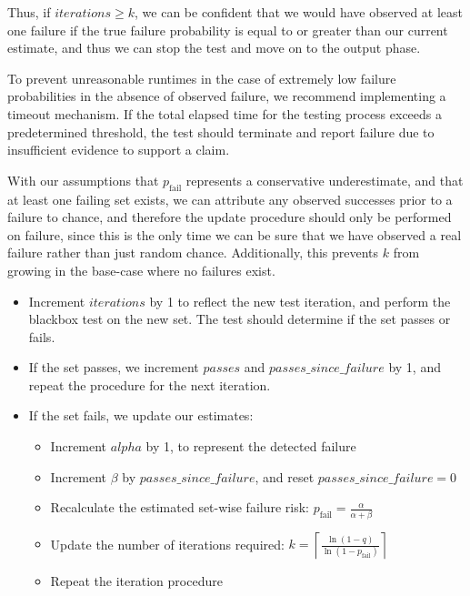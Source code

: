 Thus, if $iterations \ge k$, we can be confident that we would have observed at least one failure if the true failure probability is equal to or greater than our current estimate, and thus we can stop the test and move on to the output phase.

To prevent unreasonable runtimes in the case of extremely low failure probabilities in the absence of observed failure, we recommend implementing a timeout mechanism. If the total elapsed time for the testing process exceeds a predetermined threshold, the test should terminate and report failure due to insufficient evidence to support a claim.


 With our assumptions that $p_{\text{fail}}$ represents a conservative underestimate, and that at least one failing set exists, we can attribute any observed successes prior to a failure to chance, and therefore the update procedure should only be performed on failure, since this is the only time we can be sure that we have observed a real failure rather than just random chance. Additionally, this prevents $k$ from growing in the base-case where no failures exist.

\begin{itemize}
    \item Increment $iterations$ by 1 to reflect the new test iteration, and perform the blackbox test on the new set. The test should determine if the set passes or fails.
    \item If the set passes, we increment $passes$ and $passes\_since\_failure$ by 1, and repeat the procedure for the next iteration.
    \item If the set fails, we update our estimates:
    \begin{itemize}
        \item Increment $alpha$ by 1, to represent the detected failure
        \item Increment $\beta$ by $passes\_since\_failure$, and reset $passes\_since\_failure = 0$
        \item Recalculate the estimated set-wise failure risk: $p_{\text{fail}} = \frac{\alpha}{\alpha + \beta}$
        \item Update the number of iterations required: $k = \left\lceil \frac{\ln(1 - q)}{\ln(1 - p_{\text{fail}})} \right\rceil$
        \item Repeat the iteration procedure
    \end{itemize}
\end{itemize}

